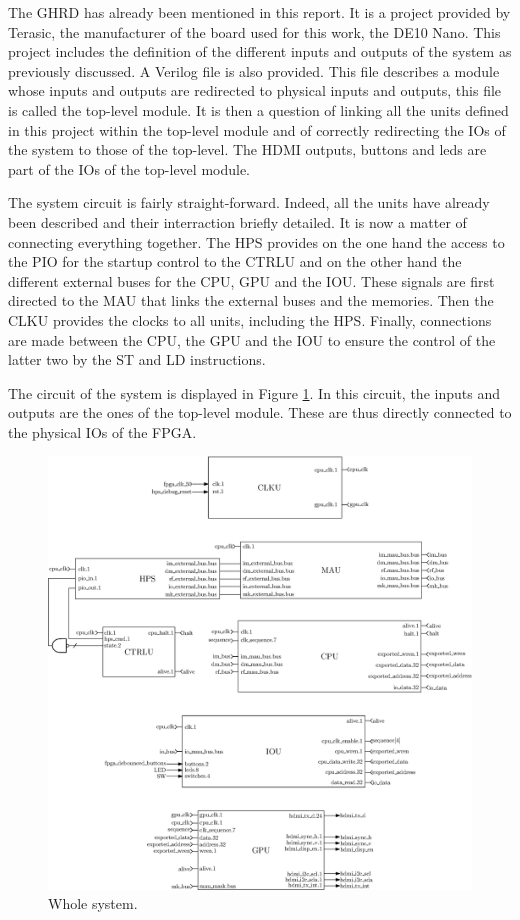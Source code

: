 The GHRD has already been mentioned in this report. It is a project provided by Terasic, the 
manufacturer of the board used for this work, the DE10 Nano. This project includes the definition 
of the different inputs and outputs of the system as previously discussed. A Verilog file is also 
provided. This file describes a module whose inputs and outputs are redirected to physical inputs 
and outputs, this file is called the top-level module. It is then a question of linking all the 
units defined in this project within the top-level module and of correctly redirecting the IOs of 
the system to those of the top-level. The HDMI outputs, buttons and leds are part of the IOs of the
top-level module.

The system circuit is fairly straight-forward. Indeed, all the units have already been described 
and their interraction briefly detailed. It is now a matter of connecting everything together. The 
HPS provides on the one hand the access to the PIO for the startup control to the CTRLU and 
on the other hand the different external buses for the CPU, GPU and the IOU. These signals are first
directed to the MAU that links the external buses and the memories. Then the CLKU provides the 
clocks to all units, including the HPS. Finally, connections are made between the CPU, the GPU and 
the IOU to ensure the control of the latter two by the ST and LD instructions.

The circuit of the system is displayed in Figure \ref{fig:system/system}. In this circuit, the inputs
and outputs are the ones of the top-level module. These are thus directly connected to the physical
IOs of the FPGA.

\begin{figure}[H]
    \centering
    \includegraphics[width=\linewidth]{Chapter6-System/res/system.eps}
    \caption{Whole system.}
    \label{fig:system/system}
\end{figure}

